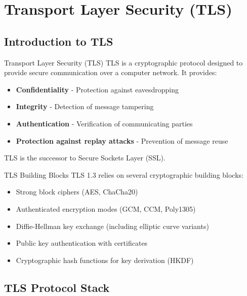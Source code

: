 \section{Transport Layer Security (TLS)}

\subsection{Introduction to TLS}

\begin{definition}{Transport Layer Security (TLS)}
TLS is a cryptographic protocol designed to provide secure communication over a computer network. It provides:
\begin{itemize}
    \item \textbf{Confidentiality} - Protection against eavesdropping
    \item \textbf{Integrity} - Detection of message tampering
    \item \textbf{Authentication} - Verification of communicating parties
    \item \textbf{Protection against replay attacks} - Prevention of message reuse
\end{itemize}
TLS is the successor to Secure Sockets Layer (SSL).
\end{definition}


\begin{concept}{TLS Building Blocks}
TLS 1.3 relies on several cryptographic building blocks:
\begin{itemize}
    \item Strong block ciphers (AES, ChaCha20)
    \item Authenticated encryption modes (GCM, CCM, Poly1305)
    \item Diffie-Hellman key exchange (including elliptic curve variants)
    \item Public key authentication with certificates
    \item Cryptographic hash functions for key derivation (HKDF)
\end{itemize}
\end{concept}

\subsection{TLS Protocol Stack}

